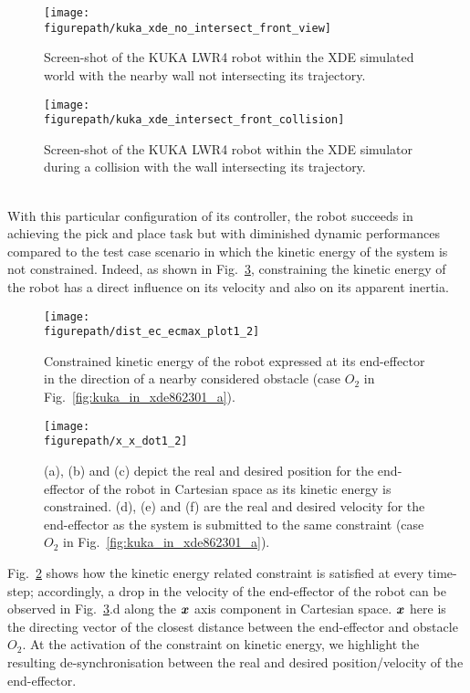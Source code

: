 \begin{figure}
\begin{minipage}[c]{0.48\linewidth}
\texttt{[image: \\figurepath/kuka\_xde\_no\_intersect\_front\_view]}
\caption{Screen-shot of the KUKA LWR4 robot within the XDE simulated world with the nearby wall not intersecting its trajectory.} 
\label{fig:kuka_xde_nearby_obst}
\end{minipage}
\hfill
\begin{minipage}[c]{0.48\linewidth}
\texttt{[image: \\figurepath/kuka\_xde\_intersect\_front\_collision]}
\caption{Screen-shot of the KUKA LWR4 robot within the XDE simulator during a collision with the wall intersecting its trajectory.} 
\label{fig:kuka_xde_obst_coll}
\end{minipage}%
\end{figure}
\\
With this particular configuration of its controller, the robot succeeds in achieving the pick and place task but with diminished dynamic performances compared to the test case scenario in which the kinetic energy of the system is not constrained. Indeed, as shown in Fig.~\ref{fig:x_x_dot1_2}, constraining the kinetic energy of the robot has a direct influence on its velocity and also on its apparent inertia.   
\begin{figure}[!htbp]
\centering
{\texttt{[image: \\figurepath/dist\_ec\_ecmax\_plot1\_2]}}
\caption{Constrained kinetic energy of the robot expressed at its end-effector in the direction of a nearby considered obstacle (case $O_2$ in Fig.~\ref{fig:kuka_in_xde862301_a}).} 
\label{fig:dist_ec_ecmax_plot1_2}
\end{figure}
\begin{figure}[!htbp]
\centering
{\texttt{[image: \\figurepath/x\_x\_dot1\_2]}}
\caption{(a), (b) and (c) depict the real and desired position for the end-effector of the robot in Cartesian space as its kinetic energy is constrained. (d), (e) and (f) are the real and desired velocity for the end-effector as the system is submitted to the same constraint (case $O_2$ in Fig.~\ref{fig:kuka_in_xde862301_a}).} 
\label{fig:x_x_dot1_2}
\end{figure}
Fig.~\ref{fig:dist_ec_ecmax_plot1_2} shows how the kinetic energy related constraint is satisfied at every time-step; accordingly, a drop in the velocity of the end-effector of the robot can be observed in Fig.~\ref{fig:x_x_dot1_2}.d along the $\mbox{\boldmath${x}$}$ axis component in Cartesian space. $\mbox{\boldmath${x}$}$ here is the directing vector of the closest distance between the end-effector and obstacle $O_2$. At the activation of the constraint on kinetic energy, we highlight the resulting de-synchronisation between the real and desired position/velocity of the end-effector. 
